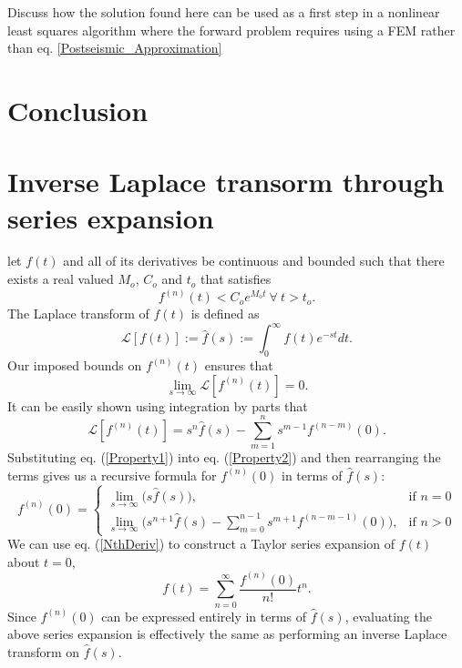 \documentclass[fleqn,12pt]{article}
\begin{document}
Discuss how the solution found here can be used as a first step in a
nonlinear least squares algorithm where the forward problem requires
using a FEM rather than eq. \ref{Postseismic_Approximation}
\section{Conclusion}

\appendix
\section{Inverse Laplace transorm through series expansion}

let $f(t)$ and all of its derivatives be continuous and bounded such 
that there exists a real valued $M_o$, $C_o$ and $t_o$ that satisfies
\begin{equation}
  f^{(n)}(t) < C_oe^{M_ot}\ \forall\ t > t_o.
\end{equation}
The Laplace transform of $f(t)$ is defined as
\begin{equation}
  \mathcal{L}[f(t)] := \hat{f}(s) := \int_{0}^\infty f(t)e^{-st}dt.
\end{equation}
Our imposed bounds on $f^{(n)}(t)$ ensures that
\begin{equation}\label{Property2}
  \lim_{s \to \infty}\mathcal{L}[f^{(n)}(t)] = 0.
\end{equation}
It can be easily shown using integration by parts that
\begin{equation}\label{Property1}
  \mathcal{L}[f^{(n)}(t)] = s^n\hat{f}(s) - \sum_{m=1}^ns^{m-1}f^{(n-m)}(0).
\end{equation}
Substituting eq. (\ref{Property1}) into eq. (\ref{Property2}) and then
rearranging the terms gives us a recursive formula for $f^{(n)}(0)$ in
terms of $\hat{f}(s)$:
\begin{equation}\label{NthDeriv}
  f^{(n)}(0) = 
  \begin{cases}
    \lim_{s \to \infty} \big( s\hat{f}(s)\big),& \text{if } n=0\\
    \lim_{s \to \infty} \big( s^{n + 1}\hat{f}(s) - 
                     \sum_{m=0}^{n-1} s^{m+1}f^{(n-m-1)}(0)\big),& \text{if } n > 0
  \end{cases}
\end{equation}
We can use eq. (\ref{NthDeriv}) to construct a Taylor series
expansion of $f(t)$ about $t=0$,
\begin{equation}
  f(t) = \sum_{n=0}^\infty\frac{f^{(n)}(0)}{n!}t^n.
\end{equation}
Since $f^{(n)}(0)$ can be expressed entirely in terms of
$\hat f(s)$, evaluating the above series expansion is effectively the
same as performing an inverse Laplace transform on $\hat f(s)$.
\end{document}
